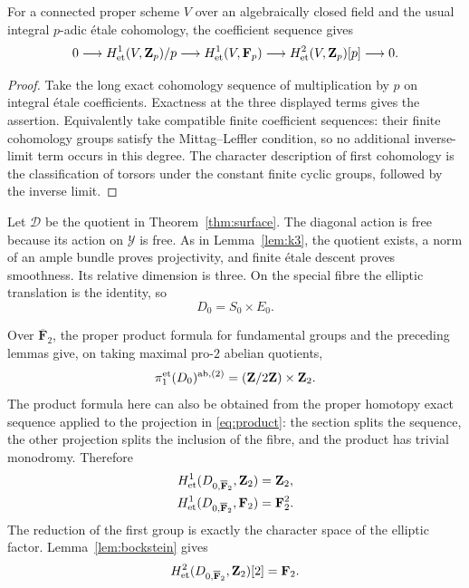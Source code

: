 \documentclass[11pt]{article}
\newcommand{\FF}{\mathbf F}\newcommand{\PP}{\mathbf P}
\newcommand{\et}{\mathrm{et}}\newcommand{\crys}{\mathrm{crys}}
\theoremstyle{definition}\newtheorem{definition}[theorem]{Definition}
\theoremstyle{remark}\newtheorem{remark}[theorem]{Remark}
\begin{document}
\begin{lemma}\label{lem:bockstein}
For a connected proper scheme $V$ over an algebraically closed field and the usual integral $p$-adic \'etale cohomology, the coefficient sequence gives
\[
 0\longrightarrow H^1_{\et}(V,\ZZ_p)/p
 \longrightarrow H^1_{\et}(V,\FF_p)
 \longrightarrow H^2_{\et}(V,\ZZ_p)[p]
 \longrightarrow0.
\]
\end{lemma}
\begin{proof}
Take the long exact cohomology sequence of multiplication by $p$ on integral \'etale coefficients. Exactness at the three displayed terms gives the assertion. Equivalently take compatible finite coefficient sequences: their finite cohomology groups satisfy the Mittag--Leffler condition, so no additional inverse-limit term occurs in this degree. The character description of first cohomology is the classification of torsors under the constant finite cyclic groups, followed by the inverse limit.
\end{proof}

Let $\mathcal D$ be the quotient in Theorem~\ref{thm:surface}. The diagonal action is free because its action on $\mathcal Y$ is free. As in Lemma~\ref{lem:k3}, the quotient exists, a norm of an ample bundle proves projectivity, and finite \'etale descent proves smoothness. Its relative dimension is three. On the special fibre the elliptic translation is the identity, so
\begin{equation}\label{eq:product}
 D_0=S_0\times E_0.
\end{equation}

Over $\overline{\FF}_2$, the proper product formula for fundamental groups and the preceding lemmas give, on taking maximal pro-$2$ abelian quotients,
\[
 \pi_1^{\et}(D_0)^{\mathrm{ab},(2)}
       =(\ZZ/2\ZZ)\times\ZZ_2.
\]
The product formula here can also be obtained from the proper homotopy exact sequence applied to the projection in \eqref{eq:product}: the section splits the sequence, the other projection splits the inclusion of the fibre, and the product has trivial monodromy. Therefore
\begin{align*}
 H^1_{\et}(D_{0,\overline{\FF}_2},\ZZ_2)&=\ZZ_2,\\
 H^1_{\et}(D_{0,\overline{\FF}_2},\FF_2)&=\FF_2^2.
\end{align*}
The reduction of the first group is exactly the character space of the elliptic factor. Lemma~\ref{lem:bockstein} gives
\begin{equation}\label{eq:special-torsion}
 H^2_{\et}(D_{0,\overline{\FF}_2},\ZZ_2)[2]=\FF_2.
\end{equation}
\end{document}
